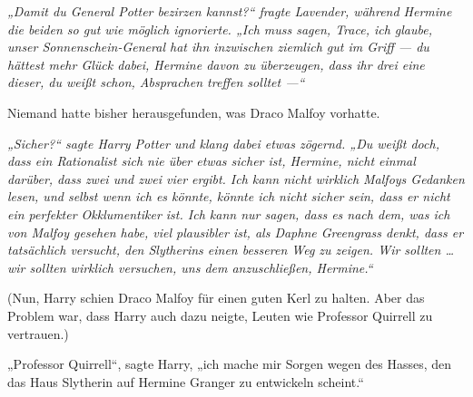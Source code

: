 \emph{„Damit du General Potter bezirzen kannst?“ fragte Lavender, während Hermine die beiden so gut wie möglich ignorierte.
„Ich muss sagen, Trace, ich glaube, unser Sonnenschein-General hat ihn inzwischen ziemlich gut im Griff — du hättest mehr Glück dabei, Hermine davon zu überzeugen, dass ihr drei eine dieser, du weißt schon, Absprachen treffen solltet —“}

Niemand hatte bisher herausgefunden, was Draco Malfoy vorhatte.

\emph{„Sicher?“ sagte Harry Potter und klang dabei etwas zögernd.
„Du weißt doch, dass ein Rationalist sich nie über etwas sicher ist, Hermine, nicht einmal darüber, dass zwei und zwei vier ergibt. Ich kann nicht wirklich Malfoys Gedanken lesen, und selbst wenn ich es könnte, könnte ich nicht sicher sein, dass er nicht ein perfekter Okklumentiker ist. Ich kann nur sagen, dass es nach dem, was ich von Malfoy gesehen habe, viel plausibler ist, als Daphne Greengrass denkt, dass er tatsächlich versucht, den Slytherins einen besseren Weg zu zeigen. Wir sollten … wir sollten wirklich versuchen, uns dem anzuschließen, Hermine.“}

(Nun, Harry schien Draco Malfoy für einen guten Kerl zu halten. Aber das Problem war, dass Harry auch dazu neigte, Leuten wie Professor Quirrell zu vertrauen.)

\later

„Professor Quirrell“, sagte Harry, „ich mache mir Sorgen wegen des Hasses, den das Haus Slytherin auf Hermine Granger zu entwickeln scheint.“

